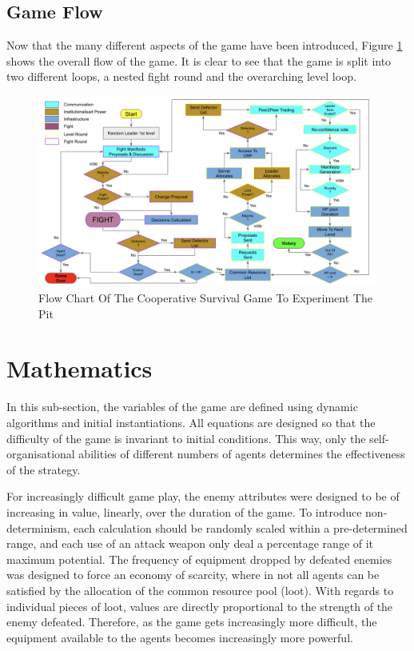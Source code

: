 \subsection{Game Flow}\label{sec:game flow}

Now that the many different aspects of the game have been introduced, Figure \ref{fig:game flow} shows the overall flow of the game. It is clear to see that the game is split into two different loops, a nested fight round and the overarching level loop. 

\begin{figure}[htb]
    \centering
    \includegraphics[scale=0.5]{001_game_design/images/gameflow.png}
    \caption{Flow Chart Of The Cooperative Survival Game To Experiment The Pit}
    \label{fig:game flow}
\end{figure}

\section{Mathematics}\label{sec: maths}

In this sub-section, the variables of the game are defined using dynamic algorithms and initial instantiations. All equations are designed so that the difficulty of the game is invariant to initial conditions. This way, only the self-organisational abilities of different numbers of agents determines the effectiveness of the strategy. 

For increasingly difficult game play, the enemy attributes were designed to be of increasing in value, linearly, over the duration of the game. To introduce non-determinism, each calculation should be randomly scaled within a pre-determined range, and each use of an attack weapon only deal a percentage range of it maximum potential. The frequency of equipment dropped by defeated enemies was designed to force an economy of scarcity, where in not all agents can be satisfied by the allocation of the common resource pool (loot). With regards to individual pieces of loot, values are directly proportional to the strength of the enemy defeated. Therefore, as the game gets increasingly more difficult, the equipment available to the agents becomes increasingly more powerful.  

